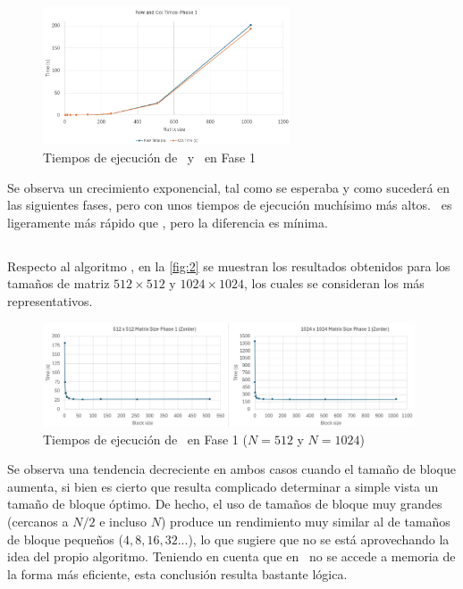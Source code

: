 \begin{figure}[h]
    \centering
    \includegraphics[width=0.65\textwidth]{img/1.png}
    \caption{Tiempos de ejecución de \rowmajor\ y \colmajor\ en Fase 1}
    \label{fig:1}
\end{figure}

Se observa un crecimiento exponencial, tal como se esperaba y como sucederá en las siguientes fases, pero con unos tiempos de ejecución 
muchísimo más altos. \colmajor\ es ligeramente más rápido que \rowmajor, pero la diferencia es mínima. 

\newpage

\subsection{\zorder} \label{sec:3.2}
Respecto al algoritmo \zorder, en la \autoref{fig:2} se muestran los resultados obtenidos para los tamaños de matriz $512 \times 512$ y $1024 \times 1024$, los 
cuales se consideran los más representativos.

\begin{figure}[h]
    \centering
    \includegraphics[width=0.98\textwidth]{img/2.png}
    \caption{Tiempos de ejecución de \zorder\ en Fase 1 ($N = 512$ y $N = 1024$)}
    \label{fig:2}
\end{figure}

Se observa una tendencia decreciente en ambos casos cuando el tamaño de bloque aumenta, si bien es cierto que resulta complicado determinar a simple vista un 
tamaño de bloque óptimo. De hecho, el uso de tamaños de bloque muy grandes (cercanos a $N/2$ e incluso $N$) produce un rendimiento muy similar al de 
tamaños de bloque pequeños ($4, 8, 16, 32 ...$), lo que sugiere que no se está aprovechando la idea del propio algoritmo. Teniendo en cuenta 
que en \python\ no se accede a memoria de la forma más eficiente, esta conclusión resulta bastante lógica.

